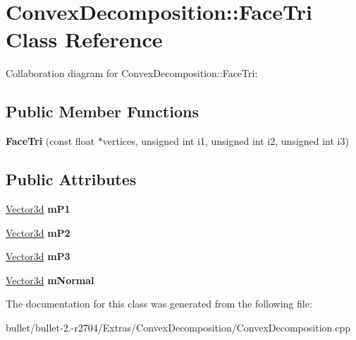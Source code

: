 \hypertarget{class_convex_decomposition_1_1_face_tri}{\section{Convex\+Decomposition\+:\+:Face\+Tri Class Reference}
\label{class_convex_decomposition_1_1_face_tri}
}


Collaboration diagram for Convex\+Decomposition\+:\+:Face\+Tri\+:
\subsection*{Public Member Functions}
\begin{DoxyCompactItemize}
\item 
\hypertarget{class_convex_decomposition_1_1_face_tri_aac872b233d0fcf045f8067274306bd34}{{\bfseries Face\+Tri} (const float $\ast$vertices, unsigned int i1, unsigned int i2, unsigned int i3)}\label{class_convex_decomposition_1_1_face_tri_aac872b233d0fcf045f8067274306bd34}

\end{DoxyCompactItemize}
\subsection*{Public Attributes}
\begin{DoxyCompactItemize}
\item 
\hypertarget{class_convex_decomposition_1_1_face_tri_a6728328221bba925cf1bf231c3090fb6}{\hyperlink{class_convex_decomposition_1_1_vector3d}{Vector3d} {\bfseries m\+P1}}\label{class_convex_decomposition_1_1_face_tri_a6728328221bba925cf1bf231c3090fb6}

\item 
\hypertarget{class_convex_decomposition_1_1_face_tri_a8076e71fcc4e7a965b1e62f52b2f168b}{\hyperlink{class_convex_decomposition_1_1_vector3d}{Vector3d} {\bfseries m\+P2}}\label{class_convex_decomposition_1_1_face_tri_a8076e71fcc4e7a965b1e62f52b2f168b}

\item 
\hypertarget{class_convex_decomposition_1_1_face_tri_a615db815dda89d71c3696a45f9885b12}{\hyperlink{class_convex_decomposition_1_1_vector3d}{Vector3d} {\bfseries m\+P3}}\label{class_convex_decomposition_1_1_face_tri_a615db815dda89d71c3696a45f9885b12}

\item 
\hypertarget{class_convex_decomposition_1_1_face_tri_ad42fd09048af2e720a9278fc844becc3}{\hyperlink{class_convex_decomposition_1_1_vector3d}{Vector3d} {\bfseries m\+Normal}}\label{class_convex_decomposition_1_1_face_tri_ad42fd09048af2e720a9278fc844becc3}

\end{DoxyCompactItemize}


The documentation for this class was generated from the following file\+:\begin{DoxyCompactItemize}
\item 
bullet/bullet-\/2.-\/r2704/\+Extras/\+Convex\+Decomposition/Convex\+Decomposition.\+cpp\end{DoxyCompactItemize}
